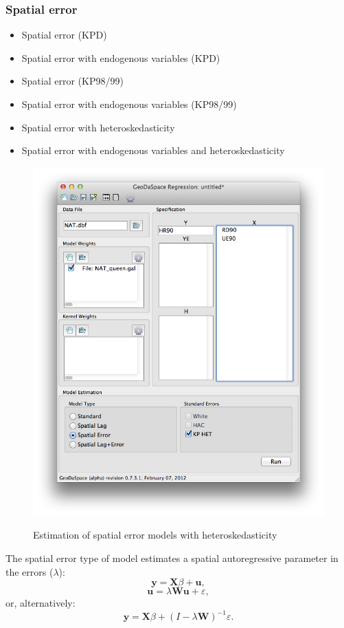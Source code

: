\documentclass{article}
\begin{document}
\subsubsection*{Spatial error}
\begin{itemize}
\item Spatial error (KPD)
\item Spatial error with endogenous variables (KPD)
\item Spatial error (KP98/99)
\item Spatial error with endogenous variables (KP98/99)
\item Spatial error with heteroskedasticity
\item Spatial error with endogenous variables and heteroskedasticity
\end{itemize}

\begin{figure}[htb]
\caption{Estimation of spatial error models with heteroskedasticity}
\label{f:GS_het}
\begin{center}
\includegraphics[width=0.7\linewidth]{GS_het.png}\\
\end{center}
\end{figure}

The spatial error type of model estimates a spatial autoregressive parameter in the errors ($\lambda$):
\begin{equation}
\mathbf{y} =  \mathbf{X}\beta + \mathbf{u},
\end{equation}
\begin{equation}
\mathbf{u} =  \lambda \mathbf{W} \mathbf{u} + \varepsilon,
\end{equation}
or, alternatively:
\begin{equation}
\mathbf{y} =  \mathbf{X}\beta + (I - \lambda \mathbf{W})^{-1} \varepsilon.
\end{equation}
\end{document}
